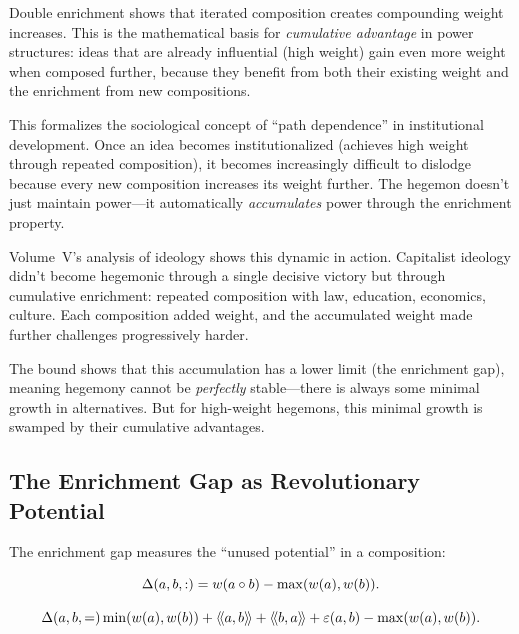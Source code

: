 \begin{interpretation}
Double enrichment shows that iterated composition creates compounding weight
increases. This is the mathematical basis for \emph{cumulative advantage} in
power structures: ideas that are already influential (high weight) gain even
more weight when composed further, because they benefit from both their existing
weight and the enrichment from new compositions.

This formalizes the sociological concept of ``path dependence'' in institutional
development. Once an idea becomes institutionalized (achieves high weight through
repeated composition), it becomes increasingly difficult to dislodge because
every new composition increases its weight further. The hegemon doesn't just
maintain power---it automatically \emph{accumulates} power through the enrichment
property.

Volume~V's analysis of ideology shows this dynamic in action. Capitalist ideology
didn't become hegemonic through a single decisive victory but through cumulative
enrichment: repeated composition with law, education, economics, culture. Each
composition added weight, and the accumulated weight made further challenges
progressively harder.

The bound shows that this accumulation has a lower limit (the enrichment gap),
meaning hegemony cannot be \emph{perfectly} stable---there is always some
minimal growth in alternatives. But for high-weight hegemons, this minimal
growth is swamped by their cumulative advantages.
\end{interpretation}

\subsection{The Enrichment Gap as Revolutionary Potential}

The enrichment gap measures the ``unused potential'' in a composition:

\begin{definition}
\label{def:enrichment-gap}
\[
  \Delta(a,b,:)= w(a \circ b) - \max(w(a), w(b)).
\]
\end{definition}

\begin{theorem}
\label{thm:enrichment-gap-decomposition}
\[
  \Delta(a, b,=) \min(w(a), w(b)) + \langle\!\langle a, b \rangle\!\rangle + \langle\!\langle b, a \rangle\!\rangle + \varepsilon(a,b) - \max(w(a), w(b)).
\]
\end{theorem}

